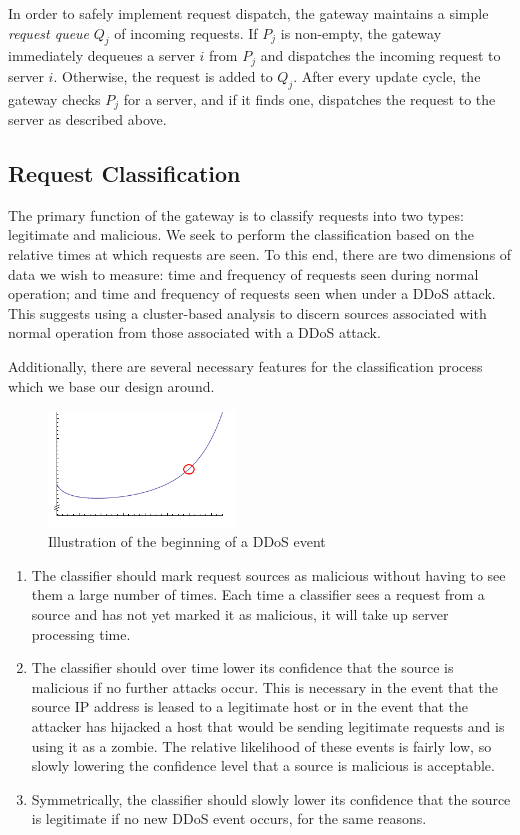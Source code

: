 \documentclass[twocolumn]{article}
\begin{document}
In order to safely implement request dispatch, the gateway maintains a simple \emph{request queue} $Q_j$ of incoming requests. If $P_j$ is non-empty, the gateway immediately dequeues a server $i$ from $P_j$ and dispatches the incoming request to server $i$. Otherwise, the request is added to $Q_j$. After every update cycle, the gateway checks $P_j$ for a server, and if it finds one, dispatches the request to the server as described above.

\subsection{Request Classification}

The primary function of the gateway is to classify requests into two types: legitimate and malicious. We seek to perform the classification based on the relative times at which requests are seen. To this end, there are two dimensions of data we wish to measure: time and frequency of requests seen during normal operation; and time and frequency of requests seen when under a DDoS attack. This suggests using a cluster-based analysis to discern sources associated with normal operation from those associated with a DDoS attack.

Additionally, there are several necessary features for the classification process which we base our design around.

\begin{figure}
\begin{center}
\includegraphics[width=5cm]{sim.png}
\end{center}
\caption{Illustration of the beginning of a DDoS event}
\label{fig:requests}
\end{figure}

\begin{enumerate}
\item The classifier should mark request sources as malicious without having to see them a large number of times. Each time a classifier sees a request from a source and has not yet marked it as malicious, it will take up server processing time. 

\item The classifier should over time lower its confidence that the source is malicious if no further attacks occur. This is necessary in the event that the source IP address is leased to a legitimate host or in the event that the attacker has hijacked a host that would be sending legitimate requests and is using it as a zombie. The relative likelihood of these events is fairly low, so slowly lowering the confidence level that a source is malicious is acceptable.

\item Symmetrically, the classifier should slowly lower its confidence that the source is legitimate if no new DDoS event occurs, for the same reasons.
\end{enumerate}
\end{document}
